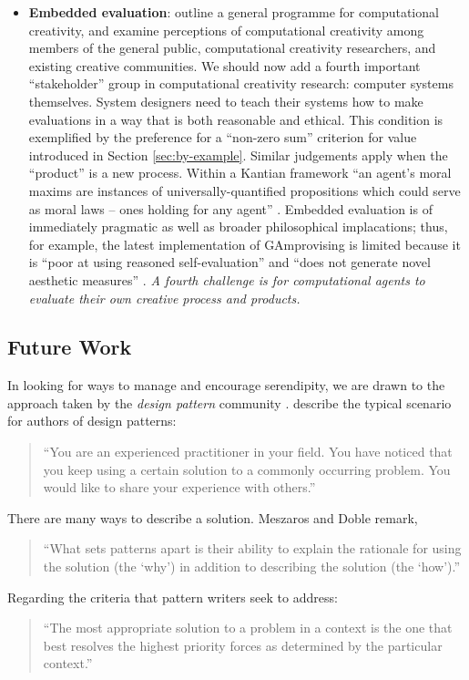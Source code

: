 \begin{itemize}
\item \textbf{Embedded evaluation}:
   outline a general programme
  for computational creativity, and examine perceptions of
  computational creativity among members of the general public,
  computational creativity researchers, and existing creative
  communities.  We should now add a fourth important ``stakeholder''
  group in computational creativity research: computer systems
  themselves.  System designers need to teach their systems how to
  make evaluations in a way that is both reasonable and ethical.  This
  condition is exemplified by the preference for a ``non-zero sum''
  criterion for value introduced in Section \ref{sec:by-example}.
  Similar judgements apply when the ``product'' is a new process.
  Within a Kantian framework ``an agent's moral maxims are instances
  of universally-quantified propositions which could serve as moral
  laws -- ones holding for any
  agent'' \cite{powers2005deontological}.
  Embedded evaluation is of immediately pragmatic as well as broader philosophical implacations;
  thus, for example, the latest implementation of {\sf GAmprovising} is limited
  because it is ``poor at using reasoned self-evaluation''
  and ``does not generate novel aesthetic measures''  \cite[pp.~189, 288]{jordanous2012evaluating}.
  \emph{A fourth challenge is for computational agents to evaluate
    their own creative process and products.}
\end{itemize}


\subsection{Future Work} \label{sec:futurework} \label{sec:hatching}

In looking for ways to manage and encourage serendipity, we are drawn
to the approach taken by the \emph{design pattern} community
\cite{alexander1999origins}. 
 describe the typical scenario for authors of design patterns:

\begin{quote}
\noindent ``You are an experienced practitioner in your field.  You
have noticed that you keep using a certain solution to a commonly
occurring problem.  You would like to share your experience with
others.''
\end{quote}
There are many ways to describe a solution.
Meszaros and Doble remark,
\begin{quote}
\noindent ``What sets patterns apart is their ability to explain the
rationale for using the solution (the `why') in addition to describing
the solution (the `how').''
\end{quote}
Regarding the criteria that pattern writers seek to address: 
\begin{quote}
\noindent ``The most appropriate solution to a problem in a context is
the one that best resolves the highest priority forces as determined
by the particular context.''
\end{quote}

